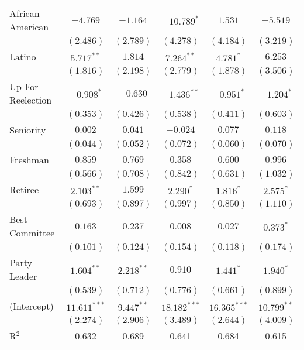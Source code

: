\documentclass[12pt]{article}
\begin{document}
\begin{table}[H]
\begin{center}
\begin{tabular}{l c c c c c }
			African American                   & $-4.769$       & $-1.164$      & $-10.789^{*}$  & $1.531$        & $-5.519$      \\
			& $(2.486)$      & $(2.789)$     & $(4.278)$      & $(4.184)$      & $(3.219)$     \\
			Latino                 & $5.717^{**}$   & $1.814$       & $7.264^{**}$   & $4.781^{*}$    & $6.253$       \\
			& $(1.816)$      & $(2.198)$     & $(2.779)$      & $(1.878)$      & $(3.506)$     \\
			Up For Reelection    & $-0.908^{*}$   & $-0.630$      & $-1.436^{**}$  & $-0.951^{*}$   & $-1.204^{*}$  \\
			& $(0.353)$      & $(0.426)$     & $(0.538)$      & $(0.411)$      & $(0.603)$     \\
			Seniority              & $0.002$        & $0.041$       & $-0.024$       & $0.077$        & $0.118$       \\
			& $(0.044)$      & $(0.052)$     & $(0.072)$      & $(0.060)$      & $(0.070)$     \\
			Freshman               & $0.859$        & $0.769$       & $0.358$        & $0.600$        & $0.996$       \\
			& $(0.566)$      & $(0.708)$     & $(0.842)$      & $(0.631)$      & $(1.032)$     \\
			Retiree                & $2.103^{**}$   & $1.599$       & $2.290^{*}$    & $1.816^{*}$    & $2.575^{*}$   \\
			& $(0.693)$      & $(0.897)$     & $(0.997)$      & $(0.850)$      & $(1.110)$     \\
			Best Committee        & $0.163$        & $0.237$       & $0.008$        & $0.027$        & $0.373^{*}$   \\
			& $(0.101)$      & $(0.124)$     & $(0.154)$      & $(0.118)$      & $(0.174)$     \\
			Party Leader                 & $1.604^{**}$   & $2.218^{**}$  & $0.910$        & $1.441^{*}$    & $1.940^{*}$   \\
			& $(0.539)$      & $(0.712)$     & $(0.776)$      & $(0.661)$      & $(0.899)$     \\
			(Intercept)            & $11.611^{***}$ & $9.447^{**}$  & $18.182^{***}$ & $16.365^{***}$ & $10.799^{**}$ \\
			& $(2.274)$      & $(2.906)$     & $(3.489)$      & $(2.644)$      & $(4.009)$     \\
			\hline
			R$^2$                  & 0.632          & 0.689         & 0.641          & 0.684          & 0.615         \\

\end{tabular}
\end{center}
\end{table}
\end{document}

